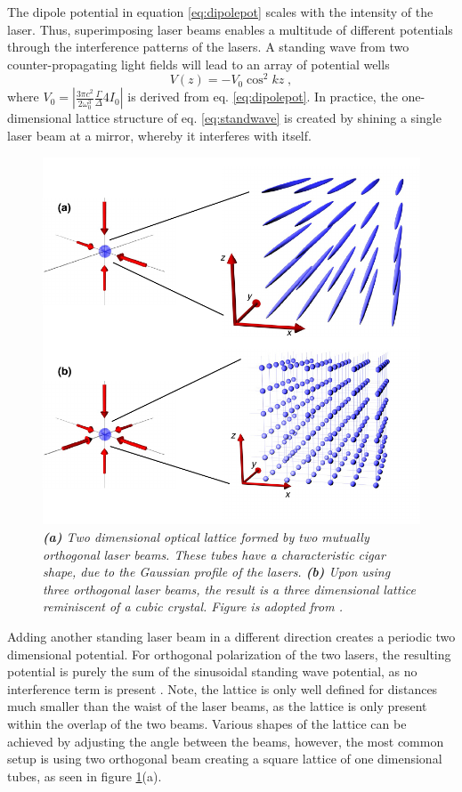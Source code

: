 The dipole potential in equation \eqref{eq:dipolepot} scales with the intensity of the laser. Thus, superimposing laser beams enables a multitude of different potentials through the interference patterns of the lasers. A standing wave from two counter-propagating light fields will lead to an array of potential wells
\begin{equation}
	V(z) = - V_0 \cos^2{k z } \; ,
	\label{eq:standwave}
\end{equation}
where $V_0 = | \frac{3 \pi c^2}{2 \omega_{0}^3} \frac{\Gamma}{\Delta} 4 I_0 |$ is derived from eq. \eqref{eq:dipolepot}. In practice, the one-dimensional lattice structure of eq. \eqref{eq:standwave} is created by shining a single laser beam at a mirror, whereby it interferes with itself.
\begin{figure}[!h]
	\centering
	\includegraphics[width=0.7\columnwidth]{Figures/OpticalLattice.pdf} 
	\caption{\textit{\textbf{(a)} Two dimensional optical lattice formed by two mutually orthogonal laser beams. These tubes have a characteristic cigar shape, due to the Gaussian profile of the lasers. \textbf{(b)} Upon using three orthogonal laser beams, the result is a three dimensional lattice reminiscent of a cubic crystal. Figure is adopted from \cite{WideraThesis}.}}
	\label{fig:OpticalLattice} 
\end{figure}
Adding another standing laser beam in a different direction creates a periodic two dimensional potential. For orthogonal polarization of the two lasers, the resulting potential is purely the sum of the sinusoidal standing wave potential, as no interference term is present \cite{lewenstein}. Note, the lattice is only well defined for distances much smaller than the waist of the laser beams, as the lattice is only present within the overlap of the two beams. Various shapes of the lattice can be achieved by adjusting the angle between the beams, however, the most common setup is using two orthogonal beam creating a square lattice of one dimensional tubes, as seen in figure \ref{fig:OpticalLattice}(a).
